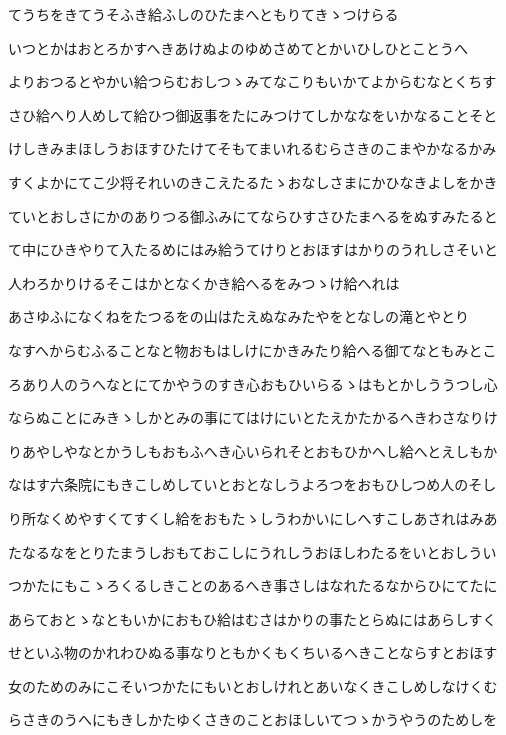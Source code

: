 \documentclass[a4paper,11pt,landscape]{ltjtarticle}
\begin{document}
てうちをきてうそふき給ふしのひたまへともりてきゝつけらる
\par\medskip
いつとかはおとろかすへきあけぬよのゆめさめてとかいひしひとことうへ
\par\medskip
よりおつるとやかい給つらむおしつゝみてなこりもいかてよからむなとくちす
\par\medskip
さひ給へり人めして給ひつ御返事をたにみつけてしかななをいかなることそと
\par\medskip
けしきみまほしうおほすひたけてそもてまいれるむらさきのこまやかなるかみ
\par\medskip
すくよかにてこ少将それいのきこえたるたゝおなしさまにかひなきよしをかき
\par\medskip
ていとおしさにかのありつる御ふみにてならひすさひたまへるをぬすみたると
\par\medskip
て中にひきやりて入たるめにはみ給うてけりとおほすはかりのうれしさそいと
\par\medskip
人わろかりけるそこはかとなくかき給へるをみつゝけ給へれは
\par\medskip
あさゆふになくねをたつるをの山はたえぬなみたやをとなしの滝とやとり
\par\medskip
なすへからむふることなと物おもはしけにかきみたり給へる御てなともみとこ
\par\medskip
ろあり人のうへなとにてかやうのすき心おもひいらるゝはもとかしううつし心
\par\medskip
ならぬことにみきゝしかとみの事にてはけにいとたえかたかるへきわさなりけ
\par\medskip
りあやしやなとかうしもおもふへき心いられそとおもひかへし給へとえしもか
\par\medskip
なはす六条院にもきこしめしていとおとなしうよろつをおもひしつめ人のそし
\par\medskip
り所なくめやすくてすくし給をおもたゝしうわかいにしへすこしあされはみあ
\par\medskip
たなるなをとりたまうしおもておこしにうれしうおほしわたるをいとおしうい
\par\medskip
つかたにもこゝろくるしきことのあるへき事さしはなれたるなからひにてたに
\par\medskip
あらておとゝなともいかにおもひ給はむさはかりの事たとらぬにはあらしすく
\par\medskip
せといふ物のかれわひぬる事なりともかくもくちいるへきことならすとおほす
\par\medskip
女のためのみにこそいつかたにもいとおしけれとあいなくきこしめしなけくむ
\par\medskip
らさきのうへにもきしかたゆくさきのことおほしいてつゝかうやうのためしを
\end{document}
